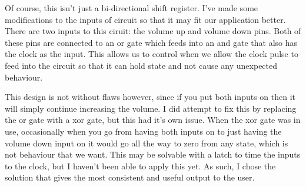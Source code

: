 \documentclass[11pt]{scrartcl}
\begin{document}
Of course, this isn't just a bi-directional shift register. I've made some modifications to
the inputs of circuit so that it may fit our application better. There are two inputs to
this ciruit: the volume up and volume down pins. Both of these pins are connected to an
or gate which feeds into an and gate that also has the clock as the input. This allows us
to control when we allow the clock pulse to feed into the circuit so that it can hold state
and not cause any unexpected behaviour.

\bigskip

This design is not without flaws however, since if you put both inputs on then it will simply
continue increasing the volume. I did attempt to fix this by replacing the or gate with a
xor gate, but this had it's own issue. When the xor gate was in use, occasionally when you go
from having both inputs on to just having the volume down input on it would go all the way to
zero from any state, which is not behaviour that we want. This may be solvable with a latch
to time the inputs to the clock, but I haven't been able to apply this yet. As such, I chose
the solution that gives the most consistent and useful output to the user.
\end{document}
